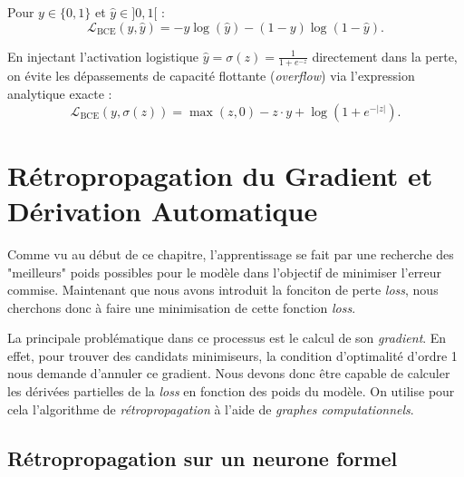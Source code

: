 \begin{definition}
    Pour $y \in \{0, 1\}$ et $\hat{y} \in ]0, 1[$ :
    \begin{equation}
        \mathcal{L}_{\mathrm{BCE}}(y, \hat{y}) = - y \log(\hat{y}) - (1 - y) \log(1 - \hat{y}).
    \end{equation}
\end{definition}

\begin{proposition}
    En injectant l'activation logistique $\hat{y} = \sigma(z) = \frac{1}{1 + e^{-z}}$ directement dans la perte, on évite les dépassements de capacité flottante (\emph{overflow}) via l'expression analytique exacte :
    \begin{equation}
        \mathcal{L}_{\mathrm{BCE}}(y, \sigma(z)) = \max(z, 0) - z \cdot y + \log\left(1 + e^{-|z|}\right).
    \end{equation}
\end{proposition}




\section{Rétropropagation du Gradient et Dérivation Automatique}

Comme vu au début de ce chapitre, l'apprentissage se fait par une recherche des "meilleurs" poids possibles pour le modèle dans l'objectif de minimiser l'erreur commise. Maintenant que nous avons introduit la fonciton de perte \emph{loss}, nous cherchons donc à faire une minimisation de cette fonction \emph{loss}. 

La principale problématique dans ce processus est le calcul de son \emph{gradient}. En effet, pour trouver des candidats minimiseurs, la condition d'optimalité d'ordre 1 nous demande d'annuler ce gradient. Nous devons donc être capable de calculer les dérivées partielles de la \emph{loss} en fonction des poids du modèle. On utilise pour cela l'algorithme de \emph{rétropropagation} à l'aide de \emph{graphes computationnels}. 

\subsection{Rétropropagation sur un neurone formel}

